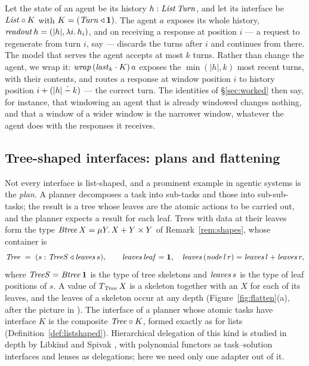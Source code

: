 \documentclass{fundam}
\begin{document}
\begin{example}\label{ex:conv-agent}
  Let the state of an agent be its history $h : \mathit{List}\,\mathit{Turn}$, and let its interface
  be $\mathit{List} \circ K$ with $K = (\mathit{Turn} \triangleleft \mathbf{1})$.  The agent $a$
  exposes its whole history, $\mathit{readout}\,h = (|h|, \lambda i.\,h_i)$, and on receiving
  a response at position $i$ --- a request to regenerate from turn $i$, say --- discards
  the turns after $i$ and continues from there.  The model that serves the agent accepts
  at most $k$ turns.  Rather than change the agent, we wrap it:
  $\mathit{wrap}\,(\mathit{last}_k \cdot K)\,a$ exposes the $\min(|h|, k)$ most recent turns, with
  their contents, and routes a response at window position $i$ to history position
  $i + (|h| \mathbin{\dot{-}} k)$ --- the correct turn.  The identities of \S\ref{sec:worked} then
  say, for instance, that windowing an agent that is already windowed changes nothing,
  and that a window of a wider window is the narrower window, whatever the agent does
  with the responses it receives.
\end{example}

\subsection{Tree-shaped interfaces: plans and flattening}\label{sec:trees}

Not every interface is list-shaped, and a prominent example in agentic systems is the
\emph{plan}.  A planner decomposes a task into sub-tasks and those into sub-sub-tasks;
the result is a tree whose leaves are the atomic actions to be carried out, and the
planner expects a result for each leaf.  Trees with data at their leaves form the type
$\mathit{Btree}\,X = \mu Y.\, X + Y \times Y$ of Remark~\ref{rem:shapes}, whose container is
\[
  \mathit{Tree} \;=\; (s : \mathit{TreeS} \triangleleft \mathit{leaves}\,s),
  \qquad
  \mathit{leaves}\,\mathit{leaf} = \mathbf{1},\quad
  \mathit{leaves}\,(\mathit{node}\,l\,r) = \mathit{leaves}\,l + \mathit{leaves}\,r,
\]
where $\mathit{TreeS} = \mathit{Btree}\,\mathbf{1}$ is the type of tree skeletons and
$\mathit{leaves}\,s$ is the type of leaf positions of $s$.  A value of
$T_{\mathit{Tree}}\,X$ is a skeleton together with an $X$ for each of its leaves, and the
leaves of a skeleton occur at any depth (Figure~\ref{fig:flatten}(a), after the picture
in \cite{AbbottAltenkirchGhaniMcBride04}).  The interface of a planner whose atomic tasks
have interface $K$ is the composite $\mathit{Tree} \circ K$, formed exactly as for lists
(Definition~\ref{def:listshaped}).  Hierarchical delegation of this kind is studied in
depth by Libkind and Spivak \cite{LibkindSpivak24}, with polynomial functors as
task--solution interfaces and lenses as delegations; here we need only one adapter out of
it.
\end{document}
